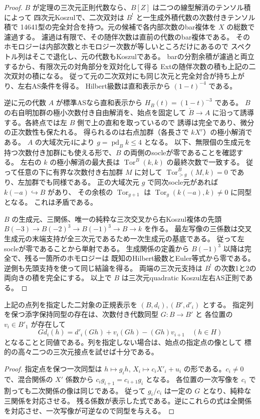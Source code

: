 \begin{proof}
$B$ が定理の三次元正則代数なら、$B[Z]$ は二つの線型解消のテンソル積によって
四次元Koszulで、二次双対は $B^!$ と一生成外積代数の次数付きテンソル積で
14641型の完全対合を持つ。元の候補で各内部次数のbar複体を $X$ の総数で濾過する。
濾過は有限で、その随伴次数は直前の代数のbar複体である。
そのホモロジーは内部次数とホモロジー次数が等しいところだけにあるので
スペクトル列はそこで退化し、元の代数もKoszulである。
barの分割余積が濾過と両立するから、有限次元の対角部分を双対化して得る
Extの随伴次数の積も上記の二次双対の積になる。
従って元の二次双対にも同じ次元と完全対合が持ち上がり、左右AS条件を得る。
Hilbert級数は直和表示から $(1-t)^{-4}$ である。

逆に元の代数 $A$ が標準ASなら直和表示から $H_B(t)=(1-t)^{-3}$ である。
$B$ の右自明加群の極小次数付き自由解消を、始点を固定して
$\check B\to A$ に沿って誘導する。各終点では左 $B$ 側で上の直和を取っているので
誘導は完全であり、微分の正次数性も保たれる。
得られるのは右点加群（各長さで $kX^r$）の極小解消である。
$A$ の大域次元4により $g=\operatorname{pd}_B k\le4$ となる。
以下、無限個の生成元を持つ次数付き加群にも使える形で、$B$ の両側のsocleが零であることを確認する。
左右の $k$ の極小解消の最大長は $\operatorname{Tor}^B(k,k)$ の最終次数で一致する。
従って任意の下に有界な次数付き右加群 $M$ に対して
$\operatorname{Tor}^B_{>g}(M,k)=0$ であり、左加群でも同様である。
正の大域次元 $g$ で同次socle元があれば $k(-a)\hookrightarrow B$ があり、
その余核の $\operatorname{Tor}_{g+1}$ は $\operatorname{Tor}_g(k(-a),k)\ne0$ に同型となる。
これは矛盾である。

$B$ の生成元、三関係、唯一の純粋な三次交叉から右Koszul複体の先頭
$B(-3)\to B(-2)^3\to B(-1)^3\to B\to k$ を作る。
最左写像の三係数は交叉生成元の末端支持が全三次元であるため一次生成元の基底である。
従って左socleが零であることから単射である。
生成関係の定義から $B(-1)^3$ 以降は完全で、残る一箇所のホモロジーは
既知のHilbert級数とEuler等式から零である。逆側も先頭支持を使って同じ結論を得る。
両端の三次元支持は $B^!$ の次数1と2の両向きの積を完全にする。
以上で $B$ は三次元quadratic Koszul左右AS正則である。
\end{proof}

\begin{corollary}\label{cor:maximal-tangent-ore-isomorphism}
上記の点列を指定した二対象の正規表示を $(B,d_i),(B',d'_i)$ とする。
指定列を保つ添字保持同型の存在は、次数付き代数同型 $G:B\to B'$ と
各位置の $v_i\in B'_1$ が存在して
\[
       Gd_i(h)=d'_i(Gh)+v_i(Gh)-(Gh)v_{i+1}\quad(h\in H)
\]
となることと同値である。列を指定しない場合は、始点の指定点の像として
標的の高々二つの三次元接点を試せば十分である。
\end{corollary}
\begin{proof}
指定点を保つ一次同型は $h\mapsto g_i h$, $X_i\mapsto c_i X'_i+u_i$
の形である。$c_i\ne0$ で、混合関係の $X'$ 係数から
$c_i g_{i+1}=c_{i+1}g_i$ となる。
各位置の一次写像を $c_i$ で割っても二次関係の像は同じである。
従って $g_i/c_i$ は一定の $G$ となり、純粋な三関係を対応させる。
残る係数が表示した式である。逆にこれらの式は全関係を対応させ、一次写像が可逆なので同型を与える。
\end{proof}

